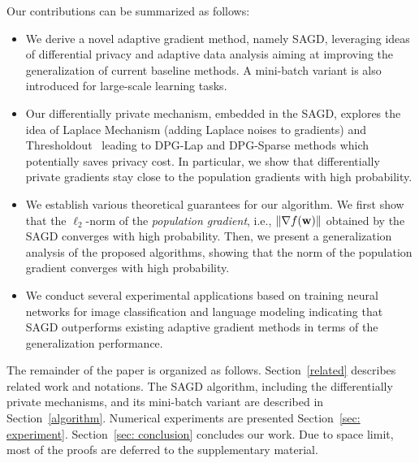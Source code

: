 \documentclass[11pt]{article}
\begin{document}
Our  contributions  can be summarized as follows:
\begin{itemize}
\item We derive a novel adaptive gradient method, namely \textsc{SAGD}, leveraging ideas of differential privacy and adaptive data analysis aiming at improving the generalization of current baseline methods. A mini-batch variant is also introduced for large-scale learning tasks.
\item Our differentially private mechanism, embedded in the \textsc{SAGD}, explores the idea of Laplace Mechanism (adding Laplace noises to gradients) and Thresholdout~\citep{dwro2014} leading to DPG-Lap and DPG-Sparse methods which potentially saves privacy cost. In particular, we show that differentially private gradients stay close to the population gradients with high probability. 
\item We establish various theoretical guarantees for our algorithm. We first show that the $\ell_2$-norm of the \emph{population gradient}, i.e., $\|\nabla f(\mathbf{w})\|$ obtained by the \textsc{SAGD} converges with high probability. Then, we present a generalization analysis of the proposed algorithms, showing that the norm of the population gradient converges with high probability.
\item We conduct several experimental applications based on training neural networks for image classification and language modeling indicating that \textsc{SAGD} outperforms existing adaptive gradient methods in terms of the generalization performance.
\end{itemize}
The remainder of the paper is organized as follows.
Section~\ref{related} describes related work and notations. 
The \textsc{SAGD} algorithm, including the differentially private mechanisms, and its mini-batch variant are described in Section~\ref{algorithm}. 
Numerical experiments are presented Section~\ref{sec: experiment}. 
Section~\ref{sec: conclusion} concludes our work. 
Due to space limit, most of the proofs are deferred to the supplementary material.
\end{document}
